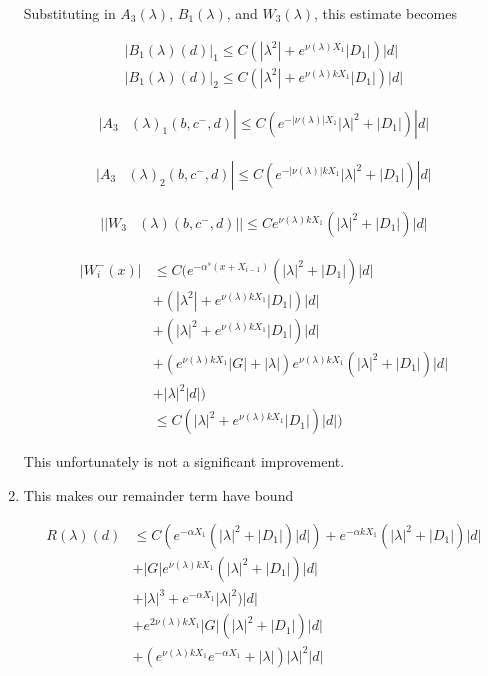 \documentclass[12pt]{article}
\begin{document}
\begin{enumerate}
Substituting in $A_3(\lambda)$, $B_1(\lambda)$, and $W_3(\lambda)$, this estimate becomes

\begin{align}
|B_1(\lambda)(d)|_1 \leq C(|\lambda^2| + e^{\nu(\lambda) X_1}|D_1|)|d| \\
|B_1(\lambda)(d)|_2 \leq C(|\lambda^2| + e^{\nu(\lambda)k X_1}|D_1|)|d|
\end{align}

\begin{align*}
|A_3&(\lambda)_1(b, c^-, d)| \leq C( e^{-|\nu(\lambda)|X_1} |\lambda|^2 + |D_1|) |d| 
\end{align*}

\begin{align*}
|A_3&(\lambda)_2(b, c^-, d)| \leq C( e^{-|\nu(\lambda)| k X_1} |\lambda|^2 + |D_1|) |d|
\end{align*}

\begin{align*}
||W_3&(\lambda)(b,c^-,d)|| \leq C e^{\nu(\lambda)k X_1} ( |\lambda|^2 + |D_1| )|d|
\end{align*}

\begin{align*}
| W_i^-(x)| &\leq C ( e^{-\alpha^s(x + X_{i-1})} ( |\lambda|^2 + |D_1|) |d| \\
&+ (|\lambda^2| + e^{\nu(\lambda)k X_1}|D_1|)|d| \\
&+ ( |\lambda|^2 + e^{\nu(\lambda)k X_1} |D_1|) |d| \\
&+ (e^{\nu(\lambda)k X_1} |G| + |\lambda|) e^{\nu(\lambda)k X_1} ( |\lambda|^2 + |D_1| )|d| \\
&+ |\lambda|^2 |d| ) \\
&\leq C(|\lambda|^2 + e^{\nu(\lambda)k X_1}|D_1|)|d|  )
\end{align*}

This unfortunately is not a significant improvement.


\item This makes our remainder term have bound

\begin{align*}
R(\lambda)(d) &\leq C( e^{-\alpha X_1}( |\lambda|^2 + |D_1|)|d|) + e^{-\alpha k X_1} ( |\lambda|^2 + |D_1|) |d| \\
&+ |G| e^{\nu(\lambda)k X_1} ( |\lambda|^2 + |D_1| )|d| \\ 
&+ |\lambda|^3 + e^{-\alpha X_1} |\lambda|^2 )|d| \\
&+ e^{2 \nu(\lambda) k X_1} |G| ( |\lambda|^2 + |D_1| )|d| \\
&+ (e^{\nu(\lambda)k X_1} e^{-\alpha X_1} + |\lambda|)|\lambda|^2|d|\\
\end{align*}

\end{enumerate}
\end{document}
